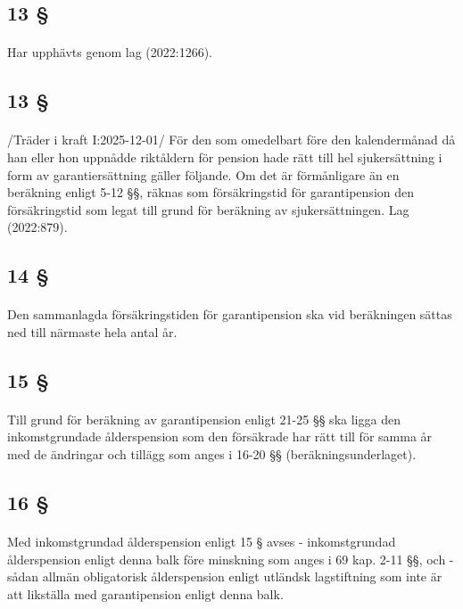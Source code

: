 \documentclass[a4paper,notitlepage,openany,10pt]{book}
\begin{document}
\subsection*{13 §}
\paragraph*{}
Har upphävts genom
lag (2022:1266).
\subsection*{13 §}
\paragraph*{}
/Träder i kraft I:2025-12-01/
För den som omedelbart före den kalendermånad då han eller hon uppnådde riktåldern för pension hade rätt till hel sjukersättning i form av garantiersättning gäller följande. Om det är förmånligare än en beräkning enligt 5-12 §§, räknas som försäkringstid för garantipension den försäkringstid som legat till grund för beräkning av sjukersättningen.
Lag (2022:879).
\subsection*{14 §}
\paragraph*{}
Den sammanlagda försäkringstiden för garantipension ska vid beräkningen sättas ned till närmaste hela antal år.
\subsection*{15 §}
\paragraph*{}
Till grund för beräkning av garantipension enligt 21-25 §§ ska ligga den inkomstgrundade ålderspension som den försäkrade har rätt till för samma år med de ändringar och tillägg som anges i 16-20 §§ (beräkningsunderlaget).
\subsection*{16 §}
\paragraph*{}
Med inkomstgrundad ålderspension enligt 15 § avses
\newline - inkomstgrundad ålderspension enligt denna balk före minskning som anges i 69 kap. 2-11 §§, och
\newline - sådan allmän obligatorisk ålderspension enligt utländsk lagstiftning som inte är att likställa med garantipension enligt denna balk.
\end{document}
